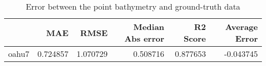 \begin{table}[h!]
\caption{Error between the point bathymetry and ground-truth data}
\label{tab:oahu7_lidar_error}
\begin{tabular}{lrrrrr}
\toprule
 & MAE & RMSE & Median Abs error & R2 Score & Average Error \\
\midrule
oahu7 & 0.724857 & 1.070729 & 0.508716 & 0.877653 & -0.043745 \\
\bottomrule
\end{tabular}
\end{table}

